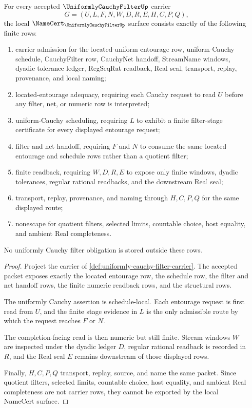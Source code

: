 \begin{theorem}
\label{thm:uniformly-cauchy-filter-namecert-obligations}
For every accepted $\UniformlyCauchyFilterUp$ carrier
$$
G=(U,L,F,N,W,D,R,E,H,C,P,Q),
$$
the local $\NameCert_{\UniformlyCauchyFilterUp}$ surface consists exactly of the following finite rows:
\begin{enumerate}
\item carrier admission for the located-uniform entourage row, uniform-Cauchy schedule, CauchyFilter row, CauchyNet handoff, StreamName windows, dyadic tolerance ledger, RegSeqRat readback, Real seal, transport, replay, provenance, and local naming;
\item located-entourage adequacy, requiring each Cauchy request to read $U$ before any filter, net, or numeric row is interpreted;
\item uniform-Cauchy scheduling, requiring $L$ to exhibit a finite filter-stage certificate for every displayed entourage request;
\item filter and net handoff, requiring $F$ and $N$ to consume the same located entourage and schedule rows rather than a quotient filter;
\item finite readback, requiring $W,D,R,E$ to expose only finite windows, dyadic tolerances, regular rational readbacks, and the downstream Real seal;
\item transport, replay, provenance, and naming through $H,C,P,Q$ for the same displayed route;
\item nonescape for quotient filters, selected limits, countable choice, host equality, and ambient Real completeness.
\end{enumerate}
No uniformly Cauchy filter obligation is stored outside these rows.
\end{theorem}
\begin{proof}
Project the carrier of \autoref{def:uniformly-cauchy-filter-carrier}. The accepted packet exposes exactly the located entourage row, the schedule row, the filter and net handoff rows, the finite numeric readback rows, and the structural rows.

The uniformly Cauchy assertion is schedule-local. Each entourage request is first read from $U$, and the finite stage evidence in $L$ is the only admissible route by which the request reaches $F$ or $N$.

The completion-facing read is then numeric but still finite. Stream windows $W$ are inspected under the dyadic ledger $D$, regular rational readback is recorded in $R$, and the Real seal $E$ remains downstream of those displayed rows.

Finally, $H,C,P,Q$ transport, replay, source, and name the same packet. Since quotient filters, selected limits, countable choice, host equality, and ambient Real completeness are not carrier rows, they cannot be exported by the local NameCert surface.
\end{proof}

